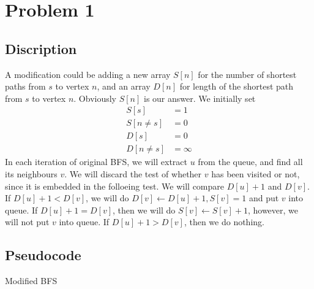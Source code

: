 \documentclass{report}
\begin{document}
    \section*{Problem 1}
    \subsection*{Discription}
    A modification could be adding a new array $S[n]$ for the number of shortest paths 
    from $s$ to vertex $n$, and an array $D[n]$ for length of the shortest path from 
    $s$ to vertex $n$. Obviously $S[n]$ is our answer. We initially set 
    \begin{align*}
        S[s] &= 1 \\
        S[n \neq s] &= 0 \\
        D[s] &= 0 \\
        D[n \neq s] &= \infty
    \end{align*}
    In each iteration of original BFS, we will extract $u$ from the queue, and find
    all its neighbours $v$. We will discard the test of whether $v$ has been visited
    or not, since it is embedded in the folloeing test.
    We will compare $D[u]+1$ and $D[v]$. If $D[u] + 1 < D[v]$, we will do 
    $D[v] \gets D[u] + 1, S[v] = 1$ and put $v$ into queue. 
    If $D[u]+1 = D[v]$, then we will do $S[v] \gets S[v] + 1$, however,
    we will not put $v$ into queue. If $D[u] + 1 > D[v]$, then we do nothing.

    \subsection*{Pseudocode}
    \begin{algorithm}
        \caption{Modified BFS}
        \begin{algorithmic}[1]
                     
                     
                    \EndIf{}
                \EndFor{}
            \EndWhile{}
        \end{algorithmic}
    \end{algorithm}
\end{document}
